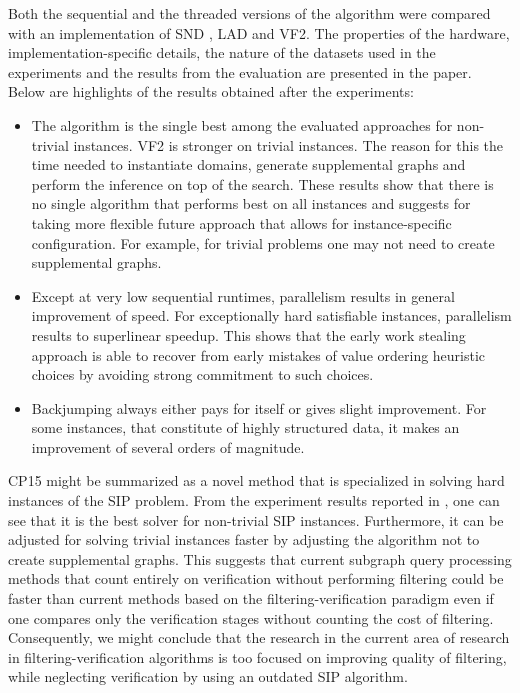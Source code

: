 \documentclass{l4proj}
\newcounter{example}[section]
\begin{document}
Both the sequential and the threaded versions of the algorithm were compared with an implementation of SND \cite{SND}, LAD\cite{Solnon:2010a} and VF2\cite{vf2}. The properties of the hardware, implementation-specific details, the nature of the datasets used in the experiments and the results from the evaluation are presented in the paper\cite{CP2015}. Below are highlights of the results obtained after the experiments:
\begin{itemize}
\item The algorithm is the single best among the evaluated approaches for non-trivial instances. VF2 is stronger on trivial instances. The reason for this the time needed to instantiate domains, generate supplemental graphs and perform the inference on top of the search. These results show that there is no single algorithm that performs best on all instances and suggests for taking more flexible future approach that allows for instance-specific configuration. For example, for trivial problems one may not need to create supplemental graphs.
\item Except at very low sequential runtimes, parallelism results in general improvement of speed. For exceptionally hard satisfiable instances, parallelism results to superlinear speedup. This shows that the early work stealing approach is able to recover from early mistakes of value ordering heuristic choices by avoiding strong commitment to such choices.
\item Backjumping always either pays for itself or gives slight improvement. For some instances, that constitute of highly structured data, it makes an improvement of several orders of magnitude.
\end{itemize}

CP15 might be summarized as a novel method that is specialized in solving hard instances of the SIP problem. From the experiment results reported in \cite{CP2015}, one can see that it is the best solver for non-trivial SIP instances. Furthermore, it can be adjusted for solving trivial instances faster by adjusting the algorithm not to create supplemental graphs. This suggests that current subgraph query processing methods that count entirely on verification without performing filtering could be faster than current methods based on the filtering-verification paradigm even if one compares only the verification stages without counting the cost of filtering. Consequently, we might conclude that the research in the current area of research in filtering-verification algorithms is too focused on improving quality of filtering, while neglecting verification by using an outdated SIP algorithm.
\end{document}
